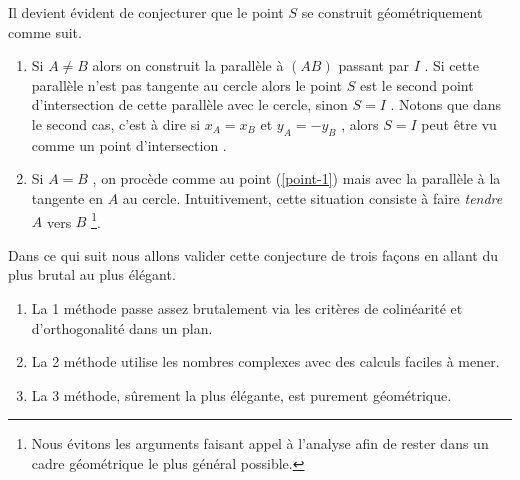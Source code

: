 Il devient évident de conjecturer que le point $S$ se construit géométriquement comme suit.

\begin{enumerate}
	\item \label{point-1} Si $A \neq B$ alors on construit la parallèle à $(AB)$ passant par $I$ . 
	Si cette parallèle n'est pas tangente au cercle alors le point $S$ est le second point d'intersection de cette parallèle avec le cercle, sinon $S = I$ .
	Notons que dans le second cas, c'est à dire si $x_A = x_B$ et $y_A = -y_B$ , alors $S = I$ peut être vu comme un point d'intersection .

	\item Si $A = B$ , on procède comme au point (\ref{point-1}) mais avec la parallèle à la tangente en $A$ au cercle. Intuitivement, cette situation consiste à faire \emph{\og tendre \fg} $A$ vers $B$ 
	\footnote{
		Nous évitons les arguments faisant appel à l'analyse afin de rester dans un cadre géométrique le plus général possible.
	}.
\end{enumerate}


\medskip

Dans ce qui suit nous allons valider cette conjecture de trois façons en allant du plus brutal au plus élégant.

\begin{enumerate}
	\item La 1\iere{} méthode passe assez brutalement via les critères de colinéarité et d'orthogonalité dans un plan.
	
	\item La 2\ieme{} méthode utilise les nombres complexes avec des calculs faciles à mener.
	
	\item La 3\ieme{} méthode, sûrement la plus élégante, est purement géométrique.
\end{enumerate}
